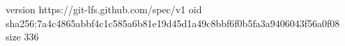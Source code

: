 version https://git-lfs.github.com/spec/v1
oid sha256:7a4c4865abbf4c1c585a6b81e19d45d1a49c8bbf6f0b5fa3a9406043f56a0f08
size 336
